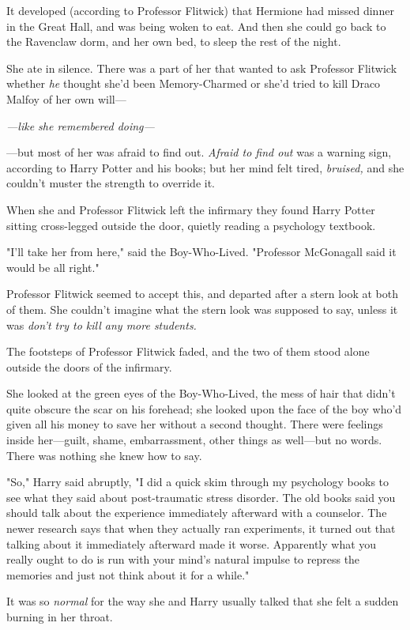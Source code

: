 It developed (according to Professor Flitwick) that Hermione had missed dinner
in the Great Hall, and was being woken to eat. And then she could go back to
the Ravenclaw dorm, and her own bed, to sleep the rest of the night.

She ate in silence. There was a part of her that wanted to ask Professor
Flitwick whether \emph{he} thought she'd been Memory-Charmed or she'd tried to
kill Draco Malfoy of her own will---

\emph{---like she remembered doing---}

---but most of her was afraid to find out. \emph{Afraid to find out} was a
warning sign, according to Harry Potter and his books; but her mind felt tired,
\emph{bruised,} and she couldn't muster the strength to override it.

When she and Professor Flitwick left the infirmary they found Harry Potter
sitting cross-legged outside the door, quietly reading a psychology textbook.

"I'll take her from here," said the Boy-Who-Lived. "Professor McGonagall said
it would be all right."

Professor Flitwick seemed to accept this, and departed after a stern look at
both of them. She couldn't imagine what the stern look was supposed to say,
unless it was \emph{don't try to kill any more students.}

The footsteps of Professor Flitwick faded, and the two of them stood alone
outside the doors of the infirmary.

She looked at the green eyes of the Boy-Who-Lived, the mess of hair that didn't
quite obscure the scar on his forehead; she looked upon the face of the boy
who'd given all his money to save her without a second thought. There were
feelings inside her---guilt, shame, embarrassment, other things as well---but
no words. There was nothing she knew how to say.

"So," Harry said abruptly, "I did a quick skim through my psychology books to
see what they said about post-traumatic stress disorder. The old books said you
should talk about the experience immediately afterward with a counselor. The
newer research says that when they actually ran experiments, it turned out that
talking about it immediately afterward made it worse. Apparently what you
really ought to do is run with your mind's natural impulse to repress the
memories and just not think about it for a while."

It was so \emph{normal} for the way she and Harry usually talked that she felt
a sudden burning in her throat.

